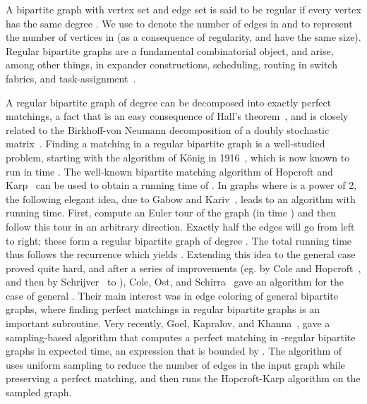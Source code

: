 \documentclass[11pt]{article}
\begin{document}
A bipartite graph  with vertex set  and edge set  is said to be regular if every vertex has the same
degree . We use  to denote the number of edges in  and  to
represent the number of vertices in  (as a consequence of regularity, 
and  have the same size). Regular bipartite graphs are a fundamental
combinatorial object, and arise, among other things, in expander
constructions, scheduling, routing in switch fabrics, and
task-assignment~\cite{mr:random,amsz:color2003,cos:regular2001}.

A regular bipartite graph of degree  can be decomposed into exactly 
perfect matchings, a fact that is an easy consequence of Hall's
theorem~\cite{b:graphtheory}, and is closely related to the Birkhoff-von
Neumann decomposition of a doubly stochastic matrix~\cite{b:bvn46,vn:bvn53}.
Finding a matching in a regular bipartite graph is a well-studied problem,
starting with the algorithm of K\"{o}nig in 1916~\cite{k:regular16}, which is
now known to run in time . The well-known bipartite matching algorithm
of Hopcroft and Karp~\cite{hk:match73} can be used to obtain a running time of
. In graphs where  is a power of 2, the following elegant
idea, due to Gabow and Kariv~\cite{gk:edge1982}, leads to an algorithm with
 running time. First, compute an Euler tour of the graph (in time
) and then follow this tour in an arbitrary direction. Exactly half the
edges will go from left to right; these form a regular bipartite graph of
degree . The total running time  thus follows the recurrence  which yields . Extending this idea to the
general case proved quite hard, and after a series of improvements (eg. by
Cole and Hopcroft~\cite{ch:color82}, and then by Schrijver~\cite{s:color99} to
), Cole, Ost, and Schirra~\cite{cos:regular2001} gave an 
algorithm for the case of general . Their main interest was in edge
coloring of general bipartite graphs, where finding perfect matchings in
regular bipartite graphs is an important
subroutine.
Very recently, Goel, Kapralov, and Khanna~\cite{gkk:rbp08}, gave a
sampling-based algorithm that computes a perfect matching in -regular
bipartite graphs in  expected time, an
expression that is bounded by .  The algorithm
of~\cite{gkk:rbp08} uses uniform sampling to reduce the number of edges in the
input graph while preserving a perfect matching, and then runs the
Hopcroft-Karp algorithm on the sampled graph.
\end{document}
